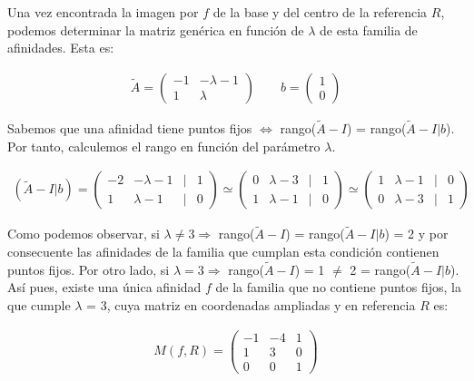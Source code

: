 \pagebreak

Una vez encontrada la imagen por $f$ de la base y del centro de la referencia $R$, podemos determinar la matriz genérica en función de $\lambda$ de esta familia de afinidades. Esta es:

\begin{gather}
    \widetilde{A} = 
    \begin{pmatrix}
    -1 & -\lambda -1\\
    1 & \lambda
    \end{pmatrix}
    \quad \quad
    b = 
    \begin{pmatrix}
    1\\ 0
    \end{pmatrix}
\end{gather}

Sabemos que una afinidad tiene puntos fijos $\Longleftrightarrow$  rango($\widetilde{A} - I$) = rango($\widetilde{A} - I | b$). Por tanto, calculemos el rango en función del parámetro $\lambda$.

\begin{gather*}
    (\widetilde{A} - I | b) =
    \begin{pmatrix}
    -2 & -\lambda - 1 & | & 1\\
    1 & \lambda - 1 & | & 0
    \end{pmatrix}
    \simeq
    \begin{pmatrix}
    0 & \lambda - 3 & | & 1\\
    1 & \lambda - 1 & | & 0
    \end{pmatrix}
    \simeq
    \begin{pmatrix}
    1 & \lambda - 1 & | & 0\\
    0 & \lambda - 3 & | & 1
    \end{pmatrix}
\end{gather*}

Como podemos observar, si $\lambda \neq 3 \Longrightarrow$ rango($\widetilde{A} - I$) = rango($\widetilde{A} - I | b$) = 2 y por consecuente las afinidades de la familia que cumplan esta condición contienen puntos fijos. Por otro lado, si $\lambda = 3 \Longrightarrow$ rango($\widetilde{A} - I$) = 1 $\neq$ 2 = rango($\widetilde{A} - I | b$). Así pues, existe una única afinidad $f$ de la familia que no contiene puntos fijos, la que cumple $\lambda$ = 3, cuya matriz en coordenadas ampliadas y en referencia $R$ es:

\begin{gather*}
    M(f, R) = 
    \begin{pmatrix}
    -1 & -4  & 1\\
    1 & 3  & 0\\
    0 & 0  & 1
    \end{pmatrix}
\end{gather*}

